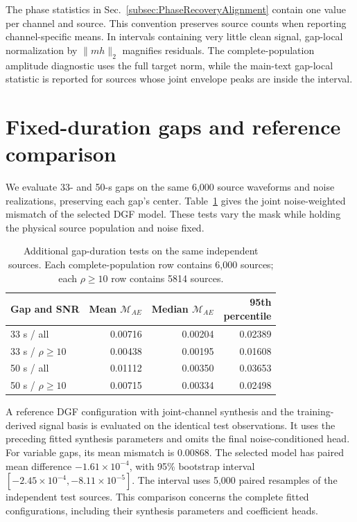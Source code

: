 \documentclass[10pt,prd,aps,a4paper,twocolumn,superscriptaddress,nofootinbib,floatfix]{revtex4-2}
\begin{document}
The phase statistics in Sec.~\ref{subsec:PhaseRecoveryAlignment} contain one value per channel and source. This convention preserves source counts when reporting channel-specific means. In intervals containing very little clean signal, gap-local normalization by $\|mh\|_2$ magnifies residuals. The complete-population amplitude diagnostic uses the full target norm, while the main-text gap-local statistic is reported for sources whose joint envelope peaks are inside the interval.

\section{Fixed-duration gaps and reference comparison}\label{app:fixed_gaps}
We evaluate 33- and 50-s gaps on the same 6,000 source waveforms and noise realizations, preserving each gap's center. Table~\ref{tab:fixed_gaps} gives the joint noise-weighted mismatch of the selected DGF model. These tests vary the mask while holding the physical source population and noise fixed.
\begin{table}[t]\centering\setlength{\tabcolsep}{2pt}
\caption{Additional gap-duration tests on the same independent sources. Each complete-population row contains 6,000 sources; each $\rho\ge10$ row contains 5814 sources.}\label{tab:fixed_gaps}
\begin{tabular}{lrrr}\hline\hline
Gap and SNR & Mean $\mathcal M_{AE}$ & Median $\mathcal M_{AE}$ & \shortstack{95th\\percentile}\\\hline
33 s / all & 0.00716 & 0.00204 & 0.02389\\
33 s / $\rho\ge10$ & 0.00438 & 0.00195 & 0.01608\\
50 s / all & 0.01112 & 0.00350 & 0.03653\\
50 s / $\rho\ge10$ & 0.00715 & 0.00334 & 0.02498\\
\hline\hline\end{tabular}\end{table}

A reference DGF configuration with joint-channel synthesis and the training-derived signal basis is evaluated on the identical test observations. It uses the preceding fitted synthesis parameters and omits the final noise-conditioned head. For variable gaps, its mean mismatch is 0.00868. The selected model has paired mean difference $-1.61\times10^{-4}$, with 95\% bootstrap interval $[-2.45\times10^{-4},-8.11\times10^{-5}]$. The interval uses 5,000 paired resamples of the independent test sources. This comparison concerns the complete fitted configurations, including their synthesis parameters and coefficient heads.


\end{document}
